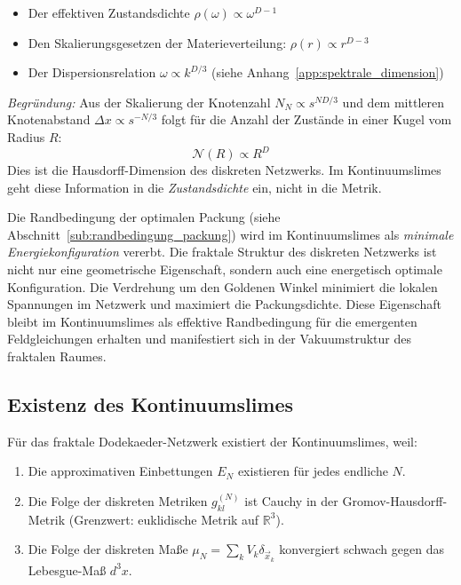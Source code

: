 \begin{itemize}
    \item Der effektiven Zustandsdichte \( \rho(\omega) \propto \omega^{D-1} \)
    \item Den Skalierungsgesetzen der Materieverteilung: \( \rho(r) \propto r^{D-3} \)
    \item Der Dispersionsrelation \( \omega \propto k^{D/3} \) (siehe Anhang~\ref{app:spektrale_dimension})
\end{itemize}

\emph{Begründung:} Aus der Skalierung der Knotenzahl \( N_N \propto s^{ND/3} \) und dem mittleren Knotenabstand \( \Delta x \propto s^{-N/3} \) folgt für die Anzahl der Zustände in einer Kugel vom Radius \( R \):
\[
\mathcal{N}(R) \propto R^D
\]
Dies ist die Hausdorff-Dimension des diskreten Netzwerks. Im Kontinuumslimes geht diese Information in die \emph{Zustandsdichte} ein, nicht in die Metrik.

Die Randbedingung der optimalen Packung (siehe Abschnitt~\ref{sub:randbedingung_packung}) wird im Kontinuumslimes als \emph{minimale Energiekonfiguration} vererbt. Die fraktale Struktur des diskreten Netzwerks ist nicht nur eine geometrische Eigenschaft, sondern auch eine energetisch optimale Konfiguration. Die Verdrehung um den Goldenen Winkel minimiert die lokalen Spannungen im Netzwerk und maximiert die Packungsdichte. Diese Eigenschaft bleibt im Kontinuumslimes als effektive Randbedingung für die emergenten Feldgleichungen erhalten und manifestiert sich in der Vakuumstruktur des fraktalen Raumes.

\subsection{Existenz des Kontinuumslimes}
\label{sub:kontinuumslimes_existenz}

Für das fraktale Dodekaeder-Netzwerk existiert der Kontinuumslimes, weil:

\begin{enumerate}
    \item Die approximativen Einbettungen \( E_N \) existieren für jedes endliche \( N \).
    \item Die Folge der diskreten Metriken \( g_{kl}^{(N)} \) ist Cauchy in der Gromov-Hausdorff-Metrik (Grenzwert: euklidische Metrik auf \( \mathbb{R}^3 \)).
    \item Die Folge der diskreten Maße \( \mu_N = \sum_k V_k \delta_{\vec{x}_k} \) konvergiert schwach gegen das Lebesgue-Maß \( d^3x \).
\end{enumerate}

